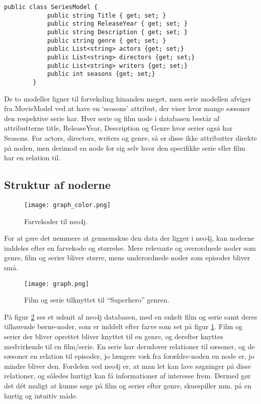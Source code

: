 \begin{tcolorbox}
    \lstset{style=sharpstyle}
    \begin{lstlisting}[language={[Sharp]C}, caption={C\# Seriesodel Class}, label={lst:series}]
        public class SeriesModel {
            public string Title { get; set; }
            public string ReleaseYear { get; set; }
            public string Description { get; set; }
            public string genre { get; set; }
            public List<string> actors {get; set;}
            public List<string> directors {get; set;}
            public List<string> writers {get; set;}
            public int seasons {get; set;}
        }
    \end{lstlisting}
\end{tcolorbox}
De to modeller ligner til forveksling hinanden meget, men serie modellen afviger fra MovieModel ved at have en ‘seasons’ attribut, der viser hvor mange sæsoner den respektive serie har. Hver serie og film node i databasen består af attributterne title, ReleaseYear, Description og Genre hvor serier også har Seasons. For actors, directors, writers og genre, så er disse ikke attributter direkte på noden, men derimod en node for sig selv hvor den specifikke serie eller film har en relation til. 

\subsection*{Struktur af noderne}
\begin{figure}[H]
    \centering
    \texttt{[image: graph\_color.png]}
    \caption{Farvekoder til neo4j.}
    \label{fig::graph_color}
\end{figure}
For at gøre det nemmere at gennemskue den data der ligger i neo4j, kan noderne inddeles efter en farvekode og størrelse. Mere relevante og overordnede noder som genre, film og serier bliver større, mens underordnede noder som episoder bliver små. 

\begin{figure}[H]
    \centering
    \texttt{[image: graph.png]}
    \caption{Film og serie tilknyttet til “Superhero” genren.}
    \label{fig::graph}
\end{figure}
På figur \ref{fig::graph} ses et udsnit af neo4j databasen, med en enkelt film og serie samt deres tilhørende børne-noder, som er inddelt efter farve som set på figur \ref{fig::graph_color}. Film og serier der bliver oprettet bliver knyttet til en genre, og derefter knyttes medvirkende til en film/serie. En serie har derudover relationer til sæsoner, og de sæsoner en relation til episoder, jo længere væk fra forældre-noden en node er, jo mindre bliver den. Fordelen ved neo4j er, at man let kan lave søgninger på disse relationer, og således hurtigt kan få informationer af interesse frem. Dermed gør det dét muligt at kunne søge på film og serier efter genre, skuespiller mm. på en hurtig og intuitiv måde. 
